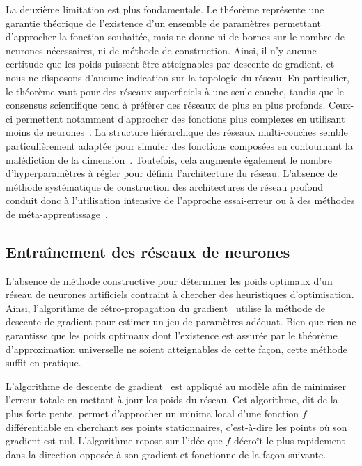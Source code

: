 La deuxième limitation est plus fondamentale. Le théorème représente une garantie théorique de l'existence d'un ensemble de paramètres permettant d'approcher la fonction souhaitée, mais ne donne ni de bornes sur le nombre de neurones nécessaires, ni de méthode de construction. Ainsi, il n'y aucune certitude que les poids puissent être atteignables par descente de gradient, et nous ne disposons d'aucune indication sur la topologie du réseau. En particulier, le théorème vaut pour des réseaux superficiels à une seule couche, tandis que le consensus scientifique tend à préférer des réseaux de plus en plus profonds. Ceux-ci permettent notamment d'approcher des fonctions plus complexes en utilisant moins de neurones~\cite{bianchini_complexity_2014,mhaskar_when_2017}. La structure hiérarchique des réseaux multi-couches semble particulièrement adaptée pour simuler des fonctions composées en contournant la malédiction de la dimension~\cite{poggio_why_2017}. Toutefois, cela augmente également le nombre d'hyperparamètres à régler pour définir l'architecture du réseau. L'absence de méthode systématique de construction des architectures de réseau profond conduit donc à l'utilisation intensive de l'approche essai-erreur ou à des méthodes de méta-apprentissage~\cite{zoph_neural_2016}.

\subsection{Entraînement des réseaux de neurones}

L'absence de méthode constructive pour déterminer les poids optimaux d'un réseau de neurones artificiels contraint à chercher des heuristiques d'optimisation. Ainsi, l'algorithme de rétro-propagation du gradient~\cite{werbos_beyond_1975,rumelhart_learning_1986,lecun_learning_1986} utilise la méthode de descente de gradient pour estimer un jeu de paramètres adéquat. Bien que rien ne garantisse que les poids optimaux dont l'existence est assurée par le théorème d'approximation universelle ne soient atteignables de cette façon, cette méthode suffit en pratique.

L'algorithme de descente de gradient~\cite{cauchy_comptes_1847} est appliqué au modèle afin de minimiser l'erreur totale en mettant à jour les poids du réseau. Cet algorithme, dit de la plus forte pente, permet d'approcher un minima local d'une fonction $f$ différentiable en cherchant ses points stationnaires, c'est-à-dire les points où son gradient est nul. L'algorithme repose sur l'idée que $f$ décroît le plus rapidement dans la direction opposée à son gradient et fonctionne de la façon suivante.

